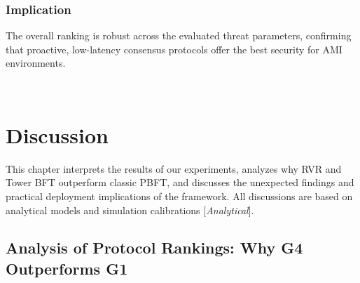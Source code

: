 \documentclass[12pt, oneside, a4paper]{report}
\theoremstyle{definition}
\theoremstyle{remark}
\newcommand{\analytical}{[\textit{Analytical}]}
\begin{document}
\subsection{Implication}
The overall ranking is robust across the evaluated threat parameters, confirming that proactive, low-latency consensus protocols offer the best security for AMI environments.



\cleardoublepage


﻿%
\chapter{Discussion}
\label{ch:discussion}

This chapter interprets the results of our experiments, analyzes why RVR and Tower BFT outperform classic PBFT, and discusses the unexpected findings and practical deployment implications of the framework. All discussions are based on analytical models and simulation calibrations \analytical.

\section{Analysis of Protocol Rankings: Why G4 Outperforms G1}
\label{sec:dis:rankings}
\end{document}

